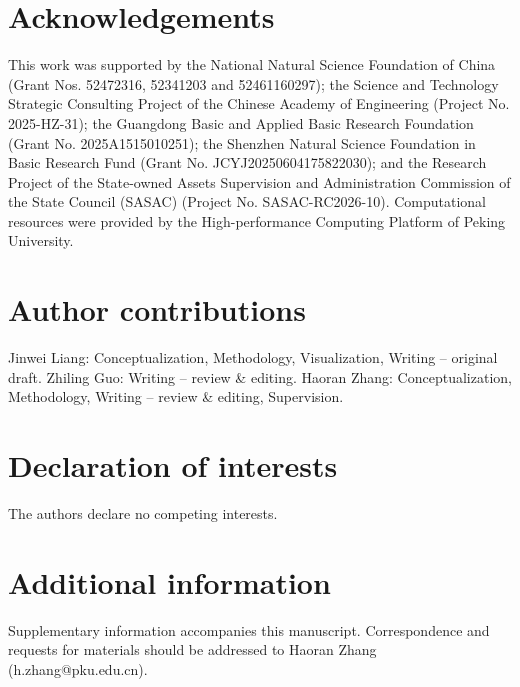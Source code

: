 \documentclass[11pt,a4paper]{article}
\begin{document}
\section*{Acknowledgements}

This work was supported by the National Natural Science Foundation of China (Grant Nos. 52472316, 52341203 and 52461160297); the Science and Technology Strategic Consulting Project of the Chinese Academy of Engineering (Project No. 2025-HZ-31); the Guangdong Basic and Applied Basic Research Foundation (Grant No. 2025A1515010251); the Shenzhen Natural Science Foundation in Basic Research Fund (Grant No. JCYJ20250604175822030); and the Research Project of the State-owned Assets Supervision and Administration Commission of the State Council (SASAC) (Project No. SASAC-RC2026-10). Computational resources were provided by the High-performance Computing Platform of Peking University.

\section*{Author contributions}

Jinwei Liang: Conceptualization, Methodology, Visualization, Writing -- original draft. Zhiling Guo: Writing -- review \& editing. Haoran Zhang: Conceptualization, Methodology, Writing -- review \& editing, Supervision.

\section*{Declaration of interests}

The authors declare no competing interests.

\section*{Additional information}

Supplementary information accompanies this manuscript. Correspondence and requests for materials should be addressed to Haoran Zhang (h.zhang@pku.edu.cn).

\clearpage
\end{document}
